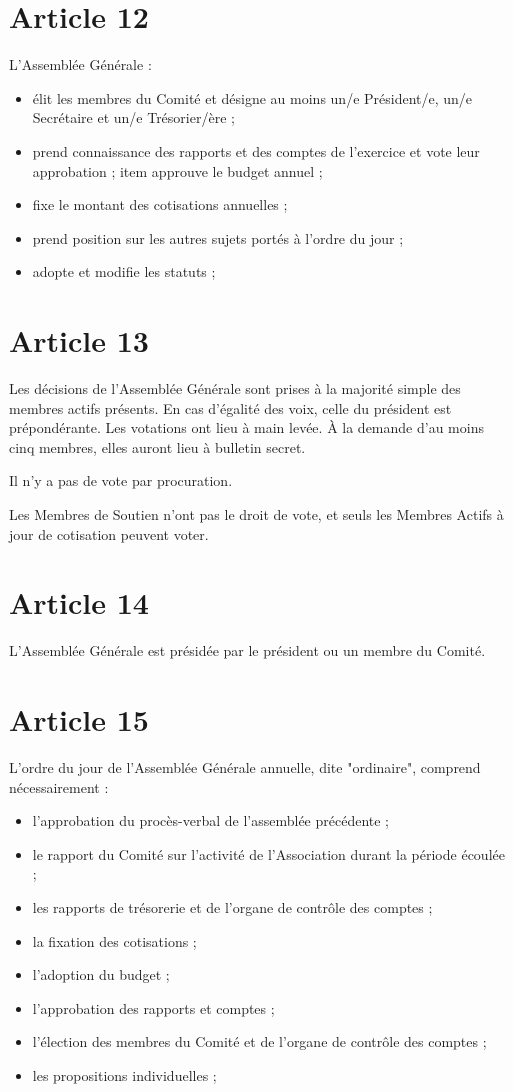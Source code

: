 \documentclass[12pt,twoside]{report}
\begin{document}
\section*{Article 12}
L’Assemblée Générale :
\begin{itemize}
\item élit les membres du Comité et désigne au moins un/e Président/e, un/e Secrétaire et un/e Trésorier/ère ;
\item prend connaissance des rapports et des comptes de l’exercice et vote leur approbation ;
item approuve le budget annuel ;
\item fixe le montant des cotisations annuelles ;
\item prend position sur les autres sujets portés à l’ordre du jour ;
\item adopte et modifie les statuts ;
\end{itemize}

\section*{Article 13}
Les décisions de l’Assemblée Générale sont prises à la majorité simple des membres actifs présents. En cas d’égalité des voix, celle du président est prépondérante.
Les votations ont lieu à main levée. À la demande d’au moins cinq membres, elles auront lieu à bulletin secret.

Il n’y a pas de vote par procuration.

Les Membres de Soutien n’ont pas le droit de vote, et seuls les Membres Actifs à jour de cotisation peuvent voter.

\section*{Article 14}
L’Assemblée Générale est présidée par le président ou un membre du Comité.

\section*{Article 15}
L’ordre du jour de l’Assemblée Générale annuelle, dite "ordinaire", comprend nécessairement :
\begin{itemize}
\item l’approbation du procès-verbal de l’assemblée précédente ;
\item le rapport du Comité sur l’activité de l’Association durant la période écoulée ;
\item les rapports de trésorerie et de l’organe de contrôle des comptes ;
\item la fixation des cotisations ;
\item l’adoption du budget ;
\item l’approbation des rapports et comptes ;
\item l’élection des membres du Comité et de l’organe de contrôle des comptes ;
\item les propositions individuelles ;
\end{itemize}
\end{document}
